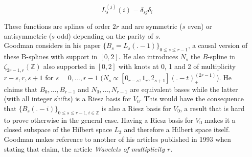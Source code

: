 \documentclass[a4paper, 11pt]{article}
\begin{document}
\begin{equation*}
  L_s^{(j)}(i) = \delta_{sj} \delta_{i}
\end{equation*}

These functions are splines of order $2r$ and are symmetric ($s$ even) or antisymmetric ($s$ odd) depending on the 
parity of $s$. \\

Goodman considers in his paper ${\{B_s = L_s(.-1)\}}_{0\leq s\leq r-1}$, a causal version of these B-splines with 
support in $[0,2]$. He also introduces $N_s$ the $B$-spline in $\zeta_{2r-1,r}(\mathbb{Z})$ also supported in $[0,2]$ 
with knots at 0, 1 and 2 of multiplicity $r-s, r, s+1$ for $s=0, \ldots, r-1$ ($N_s \propto [0_{r-s}, 1_{r}, 
2_{s+1}]{(.-t)}_+^{(2r-1)}$).  He claims that $B_0, \ldots, B_{r-1}$ and $N_0, \ldots, N_{r-1}$ are equivalent bases 
while the latter (with all integer shifts) is a Riesz basis for $V_0$. This would have the consequence that 
${\{B_s(.-i)\}}_{0\leq s\leq r-1, i\in\mathbb{Z}}$ is also a Riesz basis for $V_0$, a result that is hard to prove 
otherwise in the general case. Having a Riesz basis for $V_0$ makes it a closed subspace of the Hilbert space $L_2$ and 
therefore a Hilbert space itself. \\ 

Goodman makes reference to another of his articles published in 1993 when stating that claim, the article \emph{Wavelets 
of multiplicity $r$}.
\end{document}
